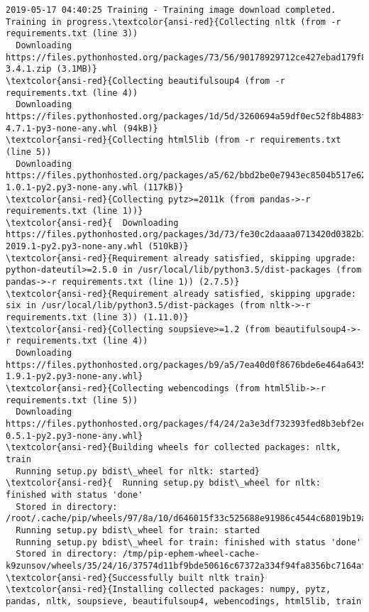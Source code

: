 \documentclass[11pt]{article}
\begin{document}
\begin{Verbatim}[commandchars=\\\{\}]
2019-05-17 04:40:25 Training - Training image download completed. Training in progress.\textcolor{ansi-red}{Collecting nltk (from -r requirements.txt (line 3))
  Downloading https://files.pythonhosted.org/packages/73/56/90178929712ce427ebad179f8dc46c8deef4e89d4c853092bee1efd57d05/nltk-3.4.1.zip (3.1MB)}
\textcolor{ansi-red}{Collecting beautifulsoup4 (from -r requirements.txt (line 4))
  Downloading https://files.pythonhosted.org/packages/1d/5d/3260694a59df0ec52f8b4883f5d23b130bc237602a1411fa670eae12351e/beautifulsoup4-4.7.1-py3-none-any.whl (94kB)}
\textcolor{ansi-red}{Collecting html5lib (from -r requirements.txt (line 5))
  Downloading https://files.pythonhosted.org/packages/a5/62/bbd2be0e7943ec8504b517e62bab011b4946e1258842bc159e5dfde15b96/html5lib-1.0.1-py2.py3-none-any.whl (117kB)}
\textcolor{ansi-red}{Collecting pytz>=2011k (from pandas->-r requirements.txt (line 1))}
\textcolor{ansi-red}{  Downloading https://files.pythonhosted.org/packages/3d/73/fe30c2daaaa0713420d0382b16fbb761409f532c56bdcc514bf7b6262bb6/pytz-2019.1-py2.py3-none-any.whl (510kB)}
\textcolor{ansi-red}{Requirement already satisfied, skipping upgrade: python-dateutil>=2.5.0 in /usr/local/lib/python3.5/dist-packages (from pandas->-r requirements.txt (line 1)) (2.7.5)}
\textcolor{ansi-red}{Requirement already satisfied, skipping upgrade: six in /usr/local/lib/python3.5/dist-packages (from nltk->-r requirements.txt (line 3)) (1.11.0)}
\textcolor{ansi-red}{Collecting soupsieve>=1.2 (from beautifulsoup4->-r requirements.txt (line 4))
  Downloading https://files.pythonhosted.org/packages/b9/a5/7ea40d0f8676bde6e464a6435a48bc5db09b1a8f4f06d41dd997b8f3c616/soupsieve-1.9.1-py2.py3-none-any.whl}
\textcolor{ansi-red}{Collecting webencodings (from html5lib->-r requirements.txt (line 5))
  Downloading https://files.pythonhosted.org/packages/f4/24/2a3e3df732393fed8b3ebf2ec078f05546de641fe1b667ee316ec1dcf3b7/webencodings-0.5.1-py2.py3-none-any.whl}
\textcolor{ansi-red}{Building wheels for collected packages: nltk, train
  Running setup.py bdist\_wheel for nltk: started}
\textcolor{ansi-red}{  Running setup.py bdist\_wheel for nltk: finished with status 'done'
  Stored in directory: /root/.cache/pip/wheels/97/8a/10/d646015f33c525688e91986c4544c68019b19a473cb33d3b55
  Running setup.py bdist\_wheel for train: started
  Running setup.py bdist\_wheel for train: finished with status 'done'
  Stored in directory: /tmp/pip-ephem-wheel-cache-k9zunsov/wheels/35/24/16/37574d11bf9bde50616c67372a334f94fa8356bc7164af8ca3}
\textcolor{ansi-red}{Successfully built nltk train}
\textcolor{ansi-red}{Installing collected packages: numpy, pytz, pandas, nltk, soupsieve, beautifulsoup4, webencodings, html5lib, train

\end{Verbatim}
\end{document}
